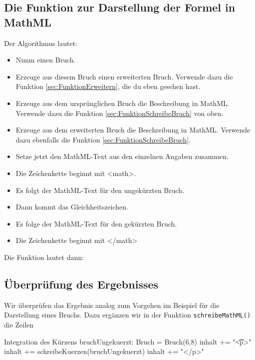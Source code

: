 \subsection{Die Funktion zur Darstellung der Formel in MathML}

Der Algorithmus lautet:
\begin{itemize}
	\item Nimm einen Bruch.
	\item Erzeuge aus diesem Bruch einen erweiterten Bruch. Verwende dazu die Funktion \ref{sec:FunktionErweitern}, die du eben gesehen hast.
	\item Erzeuge aus dem ursprünglichen Bruch die Beschreibung in MathML. Verwende dazu die Funktion \ref{sec:FunktionSchreibeBruch} von oben.
	\item Erzeuge aus dem erweiterten Bruch die Beschreibung in MathML. Verwende dazu ebenfalls die Funktion \ref{sec:FunktionSchreibeBruch}.
	\item Setze jetzt den MathML-Text aus den einzelnen Angaben zusammen.
	\item Die Zeichenkette beginnt mit <math>.
	\item Es folgt der MathML-Text für den ungekürzten Bruch.
	\item Dann kommt das Gleichheitszeichen.
	\item Es folge der MathML-Text für den gekürzten Bruch.
	\item Die Zeichenkette beginnt mit </math>
\end{itemize}

Die Funktion lautet dann:
\begin{codePython}
\end{codePython}

\subsection{Überprüfung des Ergebnisses}

Wir überprüfen das Ergebnis analog zum Vorgehen im Beispiel für die Darstellung eines Bruchs. Dazu ergänzen wir in der Funktion \texttt{schreibeMathML()} die
Zeilen

\begin{codePython}{Integration des Kürzens}
bruchUngekuerzt: Bruch = Bruch(6,8)
inhalt += "\n\t\t<p>"
inhalt += schreibeKuerzen(bruchUngekuerzt)
inhalt += "</p>"
\end{codePython}